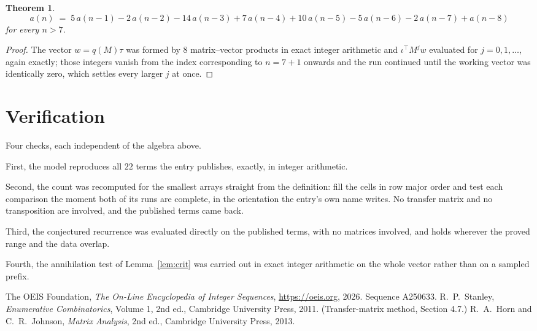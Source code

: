 \documentclass[11pt,a4paper]{article}
\theoremstyle{plain}
\newtheorem{theorem}{Theorem}
\theoremstyle{definition}
\begin{document}
\begin{theorem}
\[
a(n)\;=\;5\,a(n-1) - 2\,a(n-2) - 14\,a(n-3) + 7\,a(n-4) + 10\,a(n-5) - 5\,a(n-6) - 2\,a(n-7) + a(n-8)
\]
for every $n>7$.
\end{theorem}

\begin{proof}
The vector $w=q(M)\tau$ was formed by $8$ matrix--vector products in exact integer
arithmetic and $\iota^{\!\top}M^{j}w$ evaluated for $j=0,1,\dots$, again exactly; those
integers vanish from the index corresponding to $n=7+1$ onwards and the run continued
until the working vector was identically zero, which settles every larger $j$ at once.
\end{proof}

\section{Verification}

Four checks, each independent of the algebra above.

First, the model reproduces all $22$ terms the entry publishes, exactly, in integer
arithmetic.

Second, the count was recomputed for the smallest arrays straight from the definition: fill the
cells in row major order and test each comparison the moment both of its runs are complete,
in the orientation the entry's own name writes. No transfer matrix and no transposition are
involved, and the published terms came back.

Third, the conjectured recurrence was evaluated directly on the published terms, with no
matrices involved, and holds wherever the proved range and the data overlap.

Fourth, the annihilation test of Lemma~\ref{lem:crit} was carried out in exact integer
arithmetic on the whole vector rather than on a sampled prefix.

\begin{thebibliography}{9}
 The OEIS Foundation, \emph{The On-Line Encyclopedia of Integer
Sequences}, \url{https://oeis.org}, 2026. Sequence A250633.
 R.~P.~Stanley, \emph{Enumerative Combinatorics}, Volume 1, 2nd ed.,
Cambridge University Press, 2011. (Transfer-matrix method, Section 4.7.)
 R.~A.~Horn and C.~R.~Johnson, \emph{Matrix Analysis}, 2nd ed., Cambridge
University Press, 2013.
\end{thebibliography}
\end{document}

